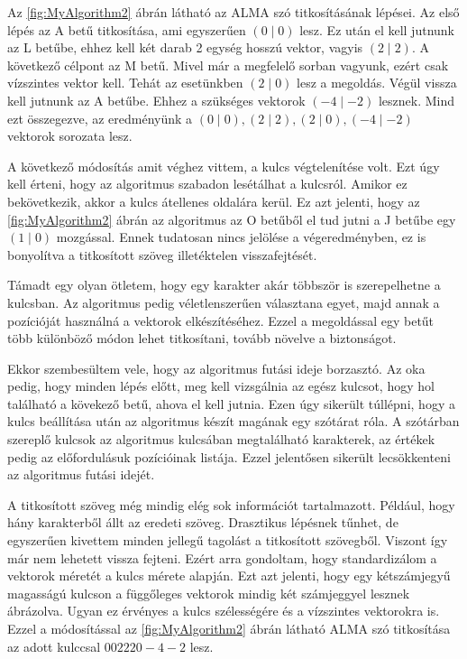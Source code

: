 \documentclass[12pt]{report} %
\begin{document}
Az \ref{fig:MyAlgorithm2} ábrán látható az ALMA szó titkosításának lépései. Az első lépés az A betű titkosítása, ami egyszerűen $(0 \mid 0)$ lesz. Ez után el kell jutnunk az L betűbe, ehhez kell két darab 2 egység hosszú vektor, vagyis $(2 \mid 2)$. A következő célpont az M betű. Mivel már a megfelelő sorban vagyunk, ezért csak vízszintes vektor kell. Tehát az esetünkben $(2 \mid 0)$ lesz a megoldás. Végül vissza kell jutnunk az A betűbe. Ehhez a szükséges vektorok $(-4 \mid -2)$ lesznek. Mind ezt összegezve, az eredményünk a $(0 \mid 0), (2 \mid 2), (2 \mid 0), (-4 \mid -2)$ vektorok sorozata lesz.

A következő módosítás amit véghez vittem, a kulcs végtelenítése volt. Ezt úgy kell érteni, hogy az algoritmus szabadon lesétálhat a kulcsról. Amikor ez bekövetkezik, akkor a kulcs átellenes oldalára kerül. Ez azt jelenti, hogy az \ref{fig:MyAlgorithm2} ábrán az algoritmus az O betűből el tud jutni a J betűbe egy $(1 \mid 0)$ mozgással. Ennek tudatosan nincs jelölése a végeredményben, ez is bonyolítva a titkosított szöveg illetéktelen visszafejtését.

Támadt egy olyan ötletem, hogy egy karakter akár többször is szerepelhetne a kulcsban. Az algoritmus pedig véletlenszerűen választana egyet, majd annak a pozícióját használná a vektorok elkészítéséhez. Ezzel a megoldással egy betűt több különböző módon lehet titkosítani, tovább növelve a biztonságot.

Ekkor szembesültem vele, hogy az algoritmus futási ideje borzasztó. Az oka pedig, hogy minden lépés előtt, meg kell vizsgálnia az egész kulcsot, hogy hol található a kövekező betű, ahova el kell jutnia. Ezen úgy sikerült túllépni, hogy a kulcs beállítása után az algoritmus készít magának egy szótárat róla. A szótárban szereplő kulcsok az algoritmus kulcsában megtalálható karakterek, az értékek pedig az előfordulásuk pozícióinak listája. Ezzel jelentősen sikerült lecsökkenteni az algoritmus futási idejét.

A titkosított szöveg még mindig elég sok információt tartalmazott. Például, hogy hány karakterből állt az eredeti szöveg. Drasztikus lépésnek tűnhet, de egyszerűen kivettem minden jellegű tagolást a titkosított szövegből. Viszont így már nem lehetett vissza fejteni. Ezért arra gondoltam, hogy standardizálom a vektorok méretét a kulcs mérete alapján. Ezt azt jelenti, hogy egy kétszámjegyű magasságú kulcson a függőleges vektorok mindig két számjeggyel lesznek ábrázolva. Ugyan ez érvényes a kulcs szélességére és a vízszintes vektorokra is. Ezzel a módosítással az \ref{fig:MyAlgorithm2} ábrán látható ALMA szó titkosítása az adott kulccsal $002220-4-2$ lesz.
\end{document}
